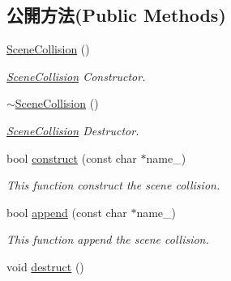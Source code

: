 \subsection*{公開方法(Public Methods)}
\begin{DoxyCompactItemize}
\item 
\hyperlink{class_magnum_1_1_scene_collision_a9934c3bee65de22ef38f32a1650c8cad}{Scene\+Collision} ()
\begin{DoxyCompactList}\small\item\em \hyperlink{class_magnum_1_1_scene_collision}{Scene\+Collision} Constructor. \end{DoxyCompactList}\item 
\hyperlink{class_magnum_1_1_scene_collision_abf49d105e9376249cfb370806a0d8e87}{$\sim$\+Scene\+Collision} ()
\begin{DoxyCompactList}\small\item\em \hyperlink{class_magnum_1_1_scene_collision}{Scene\+Collision} Destructor. \end{DoxyCompactList}\item 
bool \hyperlink{class_magnum_1_1_scene_collision_ac06f63c3a95dd5155a96299588af12e8}{construct} (const char $\ast$name\+\_\+)
\begin{DoxyCompactList}\small\item\em This function construct the scene collision. \end{DoxyCompactList}\item 
bool \hyperlink{class_magnum_1_1_scene_collision_a58440e2d63ca6ff943e66c5e0f0c8eb5}{append} (const char $\ast$name\+\_\+)
\begin{DoxyCompactList}\small\item\em This function append the scene collision. \end{DoxyCompactList}\item 
void \hyperlink{class_magnum_1_1_scene_collision_a4abd6ba47d719259922fb8ee3e5949c6}{destruct} ()\hypertarget{class_magnum_1_1_scene_collision_a4abd6ba47d719259922fb8ee3e5949c6}{}\label{class_magnum_1_1_scene_collision_a4abd6ba47d719259922fb8ee3e5949c6}


\end{DoxyCompactItemize}
